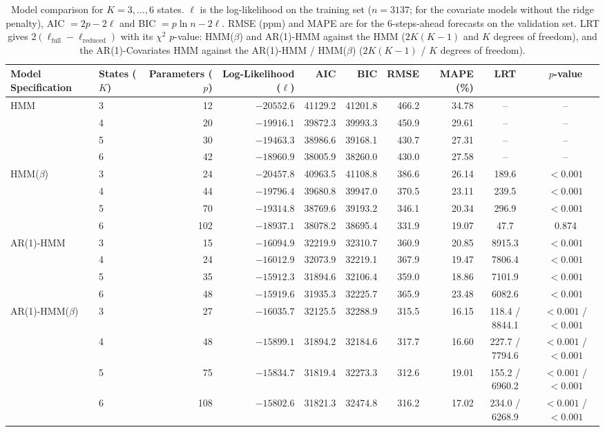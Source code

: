 \begin{table}[ht]
\centering
\begin{adjustbox}{max width=\textwidth}
\begin{tabular}{llrrrrrrcc}
\hline
Model Specification & States ($K$) & Parameters ($p$) & Log-Likelihood ($\ell$) & AIC & BIC & RMSE & MAPE (\%) & LRT & $p$-value \\
\hline
HMM & 3 & 12 & $-20552.6$ & 41129.2 & 41201.8 & 466.2 & 34.78 & -- & -- \\
 & 4 & 20 & $-19916.1$ & 39872.3 & 39993.3 & 450.9 & 29.61 & -- & -- \\
 & 5 & 30 & $-19463.3$ & 38986.6 & 39168.1 & 430.7 & 27.31 & -- & -- \\
 & 6 & 42 & $-18960.9$ & 38005.9 & 38260.0 & 430.0 & 27.58 & -- & -- \\
\hline
HMM($\beta$) & 3 & 24 & $-20457.8$ & 40963.5 & 41108.8 & 386.6 & 26.14 & 189.6 & $<0.001$ \\
 & 4 & 44 & $-19796.4$ & 39680.8 & 39947.0 & 370.5 & 23.11 & 239.5 & $<0.001$ \\
 & 5 & 70 & $-19314.8$ & 38769.6 & 39193.2 & 346.1 & 20.34 & 296.9 & $<0.001$ \\
 & 6 & 102 & $-18937.1$ & 38078.2 & 38695.4 & 331.9 & 19.07 & 47.7 & 0.874 \\
\hline
AR(1)-HMM & 3 & 15 & $-16094.9$ & 32219.9 & 32310.7 & 360.9 & 20.85 & 8915.3 & $<0.001$ \\
 & 4 & 24 & $-16012.9$ & 32073.9 & 32219.1 & 367.9 & 19.47 & 7806.4 & $<0.001$ \\
 & 5 & 35 & $-15912.3$ & 31894.6 & 32106.4 & 359.0 & 18.86 & 7101.9 & $<0.001$ \\
 & 6 & 48 & $-15919.6$ & 31935.3 & 32225.7 & 365.9 & 23.48 & 6082.6 & $<0.001$ \\
\hline
AR(1)-HMM($\beta$) & 3 & 27 & $-16035.7$ & 32125.5 & 32288.9 & 315.5 & 16.15 & 118.4 / 8844.1 & $<0.001$ / $<0.001$ \\
 & 4 & 48 & $-15899.1$ & 31894.2 & 32184.6 & 317.7 & 16.60 & 227.7 / 7794.6 & $<0.001$ / $<0.001$ \\
 & 5 & 75 & $-15834.7$ & 31819.4 & 32273.3 & 312.6 & 19.01 & 155.2 / 6960.2 & $<0.001$ / $<0.001$ \\
 & 6 & 108 & $-15802.6$ & 31821.3 & 32474.8 & 316.2 & 17.02 & 234.0 / 6268.9 & $<0.001$ / $<0.001$ \\
\hline
\end{tabular}
\end{adjustbox}
\caption{Model comparison for $K = 3, \dots, 6$ states. $\ell$ is the log-likelihood on the training set ($n = 3137$; for the covariate models without the ridge penalty), AIC $= 2p - 2\ell$ and BIC $= p\ln n - 2\ell$. RMSE (ppm) and MAPE are for the 6-steps-ahead forecasts on the validation set. LRT gives $2(\ell_{\mathrm{full}} - \ell_{\mathrm{reduced}})$ with its $\chi^2$ $p$-value: HMM($\beta$) and AR(1)-HMM against the HMM ($2K(K-1)$ and $K$ degrees of freedom), and the AR(1)-Covariates HMM against the AR(1)-HMM / HMM($\beta$) ($2K(K-1)$ / $K$ degrees of freedom).}
\label{tab:model_comparison_room_015_calibrated_anchor_random_search_val_h6}
\end{table}
